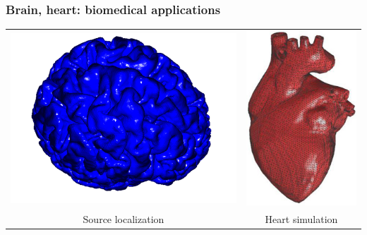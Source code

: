 \documentclass[handout]{beamer}
{
\usepackage{fullpage}
\usepackage{hyperref}
\usepackage{amssymb} 
}
\begin{document}
\begin{frame}
\frametitle{Brain, heart: biomedical applications}
\begin{center}
\begin{tabular}{cc}
\includegraphics[totalheight=2in,angle=0]{figures/brain1.pdf} &
\includegraphics[totalheight=2in,angle=0]{figures/heart.jpg} \\
Source localization & Heart simulation
\end{tabular}
\end{center}
\end{frame}
\end{document}
